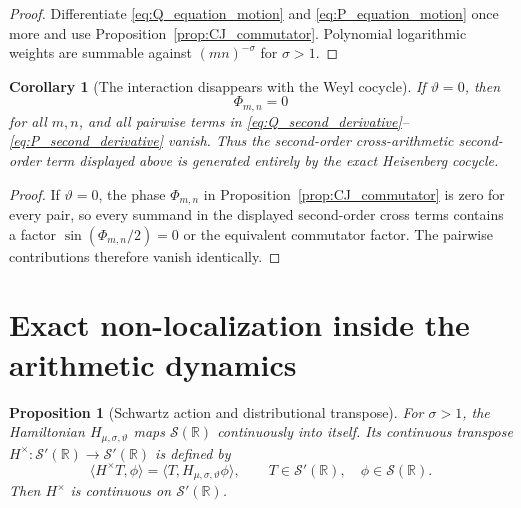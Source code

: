 \documentclass[11pt]{amsart}
\numberwithin{equation}{section}
\theoremstyle{plain}
\newtheorem{proposition}[theorem]{Proposition}
\newtheorem{corollary}[theorem]{Corollary}
\theoremstyle{definition}
\theoremstyle{remark}
\newcommand{\R}{\mathbb{R}}
\newcommand{\Sch}{\mathcal{S}}
\begin{document}
\begin{proof}
Differentiate \eqref{eq:Q_equation_motion} and
\eqref{eq:P_equation_motion} once more and use
Proposition~\ref{prop:CJ_commutator}.  Polynomial logarithmic weights are
summable against $(mn)^{-\sigma}$ for $\sigma>1$.
\end{proof}

\begin{corollary}[The interaction disappears with the Weyl cocycle]
\label{cor:interaction_disappears}
If $\vartheta=0$, then
\begin{equation}
\Phi_{m,n}=0
\label{eq:Phi_zero}
\end{equation}
for all $m,n$, and all pairwise terms in
\eqref{eq:Q_second_derivative}--\eqref{eq:P_second_derivative} vanish.
Thus the second-order cross-arithmetic second-order term displayed above is generated
entirely by the exact Heisenberg cocycle.
\end{corollary}

\begin{proof}
If \(\vartheta=0\), the phase \(\Phi_{m,n}\) in
Proposition~\ref{prop:CJ_commutator} is zero for every pair, so every summand
in the displayed second-order cross terms contains a factor
\(\sin(\Phi_{m,n}/2)=0\) or the equivalent commutator factor.  The pairwise
contributions therefore vanish identically.
\end{proof}

\section{Exact non-localization inside the arithmetic dynamics}
\label{sec:nonlocalization}

\begin{proposition}[Schwartz action and distributional transpose]
\label{prop:schwartz_distribution_extension}
For \(\sigma>1\), the Hamiltonian
\(H_{\mu,\sigma,\vartheta}\) maps \(\Sch(\R)\) continuously into
itself.  Its continuous transpose
\(H^{\times}:\Sch'(\R)\to\Sch'(\R)\) is defined by
\begin{equation}
\langle H^{\times}T,\phi\rangle
=
\langle T,H_{\mu,\sigma,\vartheta}\phi\rangle,
\qquad
T\in\Sch'(\R),\quad\phi\in\Sch(\R).
\label{eq:distributional_transpose_definition}
\end{equation}
Then \(H^{\times}\) is continuous on \(\Sch'(\R)\).
\end{proposition}
\end{document}
